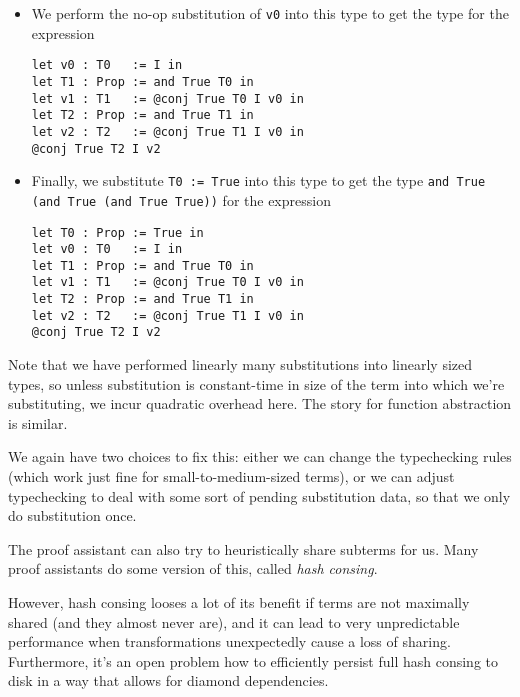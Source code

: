 \begin{itemize}
\begin{verbatim}
\end{verbatim}
  \item
  We perform the no-op substitution of \texttt{v0} into this type to get the type for the expression
\begin{verbatim}
let v0 : T0   := I in
let T1 : Prop := and True T0 in
let v1 : T1   := @conj True T0 I v0 in
let T2 : Prop := and True T1 in
let v2 : T2   := @conj True T1 I v0 in
@conj True T2 I v2
\end{verbatim}
  \item
  Finally, we substitute \texttt{T0 := True} into this type to get the type \texttt{and True (and True (and True True))} for the expression
\begin{verbatim}
let T0 : Prop := True in
let v0 : T0   := I in
let T1 : Prop := and True T0 in
let v1 : T1   := @conj True T0 I v0 in
let T2 : Prop := and True T1 in
let v2 : T2   := @conj True T1 I v0 in
@conj True T2 I v2
\end{verbatim}
\end{itemize}
Note that we have performed linearly many substitutions into linearly sized types, so unless substitution is constant-time in size of the term into which we're substituting, we incur quadratic overhead here.
The story for function abstraction is similar.
%

%

We again have two choices to fix this:
either we can change the typechecking rules (which work just fine for small-to-medium-sized terms), or we can adjust typechecking to deal with some sort of pending substitution data, so that we only do substitution once.

%

%

%

The proof assistant can also try to heuristically share subterms for us.
Many proof assistants do some version of this, called \emph{hash consing}.
%

However, hash consing looses a lot of its benefit if terms are not maximally shared (and they almost never are), and it can lead to very unpredictable performance when transformations unexpectedly cause a loss of sharing.
%
Furthermore, it's an open problem how to efficiently persist full hash consing to disk in a way that allows for diamond dependencies.
%
%
%

